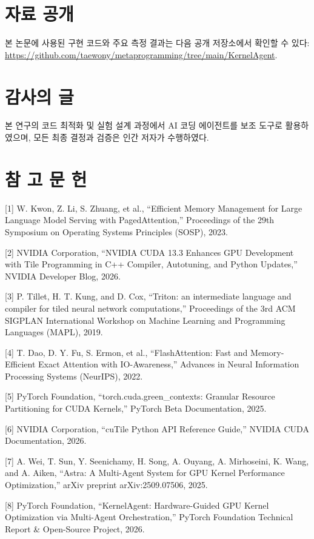 \documentclass{kcc} %
\begin{document}
\section*{자료 공개}

본 논문에 사용된 구현 코드와 주요 측정 결과는 다음 공개 저장소에서 확인할 수 있다: \url{https://github.com/taewony/metaprogramming/tree/main/KernelAgent}.


\section*{감사의 글}

본 연구의 코드 최적화 및 실험 설계 과정에서 AI 코딩 에이전트를 보조 도구로 활용하였으며, 모든 최종 결정과 검증은 인간 저자가 수행하였다.


\section*{참 고 문 헌}

[1] W. Kwon, Z. Li, S. Zhuang, et al., “Efficient Memory Management for Large Language Model Serving with PagedAttention,” Proceedings of the 29th Symposium on Operating Systems Principles (SOSP), 2023.


[2] NVIDIA Corporation, “NVIDIA CUDA 13.3 Enhances GPU Development with Tile Programming in C++ Compiler, Autotuning, and Python Updates,” NVIDIA Developer Blog, 2026.


[3] P. Tillet, H. T. Kung, and D. Cox, “Triton: an intermediate language and compiler for tiled neural network computations,” Proceedings of the 3rd ACM SIGPLAN International Workshop on Machine Learning and Programming Languages (MAPL), 2019.


[4] T. Dao, D. Y. Fu, S. Ermon, et al., “FlashAttention: Fast and Memory-Efficient Exact Attention with IO-Awareness,” Advances in Neural Information Processing Systems (NeurIPS), 2022.


[5] PyTorch Foundation, “torch.cuda.green\_contexts: Granular Resource Partitioning for CUDA Kernels,” PyTorch Beta Documentation, 2025.


[6] NVIDIA Corporation, “cuTile Python API Reference Guide,” NVIDIA CUDA Documentation, 2026.


[7] A. Wei, T. Sun, Y. Seenichamy, H. Song, A. Ouyang, A. Mirhoseini, K. Wang, and A. Aiken, “Astra: A Multi-Agent System for GPU Kernel Performance Optimization,” arXiv preprint arXiv:2509.07506, 2025.


[8] PyTorch Foundation, “KernelAgent: Hardware-Guided GPU Kernel Optimization via Multi-Agent Orchestration,” PyTorch Foundation Technical Report \& Open-Source Project, 2026.
\end{document}
